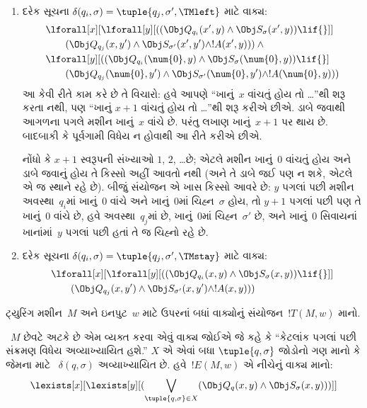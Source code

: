 \begin{enumerate}
\begin{enumerate}
\item {} દરેક સૂચના
  $\delta(q_i, \sigma) =
  \tuple{q_j, \sigma', \TMleft}$ માટે વાક્ય:
\begin{align*}
& \lforall[x][\lforall[y][
    ((\Obj Q_{q_i}(x', y) \land \Obj S_{\sigma}(x', y)) \lif {}]]\\
& \qquad   (\Obj Q_{q_j}(x, y') \land \Obj S_{\sigma'}(x', y') \land
!A(x', y))) \land {}\\
& \lforall[y][((\Obj Q_{q_i}(\num{0}, y) \land \Obj S_{\sigma}(\num{0},
    y)) \lif {}]\\
& \qquad (\Obj Q_{q_j}(\num{0}, y') \land \Obj S_{\sigma'}(\num{0},
  y') \land !A(\num{0}, y)))
\end{align*}
આ કેવી રીતે કામ કરે છે તે વિચારો: હવે આપણે
``ખાનું~$x$ વાંચતું હોય તો \dots''થી શરૂ કરતા નથી,
પણ ``ખાનું $x+1$ વાંચતું હોય તો \dots''થી શરૂ કરીએ
છીએ. ડાબે જવાથી આગળના પગલે મશીન ખાનું~$x$
વાંચે છે. પરંતુ લખાણ ખાનું~$x+1$ પર થાય છે.
બાદબાકી કે પૂર્વગામી વિધેય ન હોવાથી આ રીતે કરીએ
છીએ.

નોંધો કે $x+1$ સ્વરૂપની સંખ્યાઓ $1$, $2$, \dots છે;
એટલે મશીન ખાનું~$0$ વાંચતું હોય અને ડાબે જવાનું હોય
તે કિસ્સો અહીં આવતો નથી (અને તે ડાબે જઈ પણ ન શકે,
એટલે એ જ સ્થાને રહે છે). બીજું સંયોજન એ ખાસ કિસ્સો
આવરે છે: $y$ પગલાં પછી મશીન અવસ્થા~$q_i$માં
ખાનું~$0$ વાંચે અને ખાનું~$0$માં ચિહ્ન~$\sigma$
હોય, તો $y+1$ પગલાં પછી પણ તે ખાનું~$0$ વાંચે છે,
હવે અવસ્થા~$q_j$માં છે, ખાનું~$0$માં ચિહ્ન~$\sigma'$
છે, અને ખાનું~$0$ સિવાયનાં ખાનાંમાં~$y$ પગલાં
પછી હતાં તે જ ચિહ્નો રહે છે.
\item {} દરેક સૂચના
  $\delta(q_i, \sigma) =
  \tuple{q_j, \sigma', \TMstay}$ માટે વાક્ય:
\begin{align*}
& \lforall[x][\lforall[y][(
   (\Obj Q_{q_i}(x, y) \land \Obj S_{\sigma}(x, y)) \lif {}]] \\
&\qquad   (\Obj Q_{q_j}(x, y') \land \Obj S_{\sigma'}(x, y') \land
!A(x, y)))
\end{align*}
\end{enumerate}
\end{enumerate}
ટ્યુરિંગ મશીન~$M$ અને ઇનપુટ~$w$ માટે ઉપરનાં
બધાં વાક્યોનું સંયોજન~$!T(M, w)$ માનો.

~$M$ છેવટે અટકે છે એમ વ્યક્ત કરવા એવું વાક્ય
જોઈએ જે કહે કે ``કેટલાંક પગલાં પછી સંક્રમણ વિધેય
અવ્યાખ્યાયિત હશે.'' $X$ એ એવાં બધા
$\tuple{q, \sigma}$ જોડોનો ગણ માનો કે જેમના માટે
~$\delta(q, \sigma)$ અવ્યાખ્યાયિત છે. હવે~$!E(M, w)$
એ નીચેનું વાક્ય માનો:
\[
\lexists[x][\lexists[y][(\bigvee_{\tuple{q, \sigma} \in
      X}(\Obj Q_q(x, y) \land \Obj S_\sigma(x, y)))]]
\]

